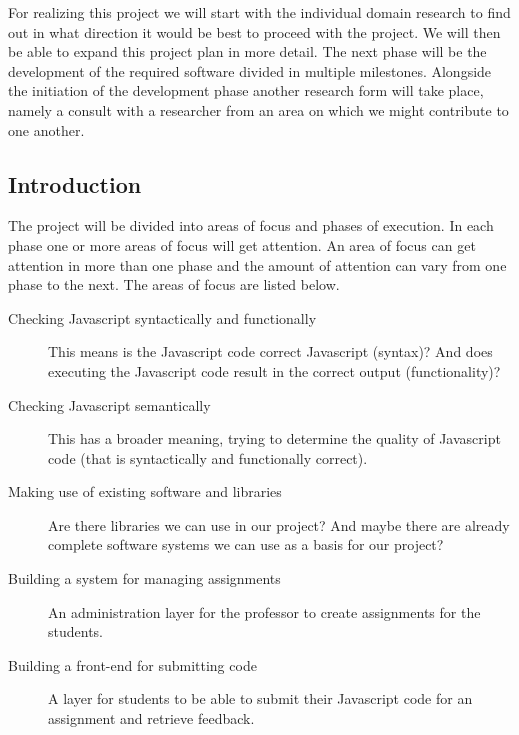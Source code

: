 \documentclass{article}
\begin{document}

For realizing this project we will start with the individual domain research to
find out in what direction it would be best to proceed with the project. We
will then be able to expand this project plan in more detail. The next phase
will be the development of the required software divided in multiple
milestones. Alongside the initiation of the development phase another research
form will take place, namely a consult with a researcher from an area on which
we might contribute to one another.

\subsection{Introduction}


The project will be divided into areas of focus and phases of execution. In
each phase one or more areas of focus will get attention. An area of focus can
get attention in more than one phase and the amount of attention can vary from
one phase to the next. The areas of focus are listed below.

\begin{description}
  \item[Checking Javascript syntactically and functionally] This means is the
    Javascript code correct Javascript (syntax)? And does executing the
    Javascript code result in the correct output (functionality)?
  \item[Checking Javascript semantically] This has a broader meaning, trying to
    determine the quality of Javascript code (that is syntactically and
    functionally correct).
  \item[Making use of existing software and libraries] Are there libraries we
    can use in our project? And maybe there are already complete software
    systems we can use as a basis for our project?
  \item[Building a system for managing assignments] An administration layer for
    the professor to create assignments for the students.
  \item[Building a front-end for submitting code] A layer for students to be
    able to submit their Javascript code for an assignment and retrieve
    feedback.
\end{description}
\end{document}
